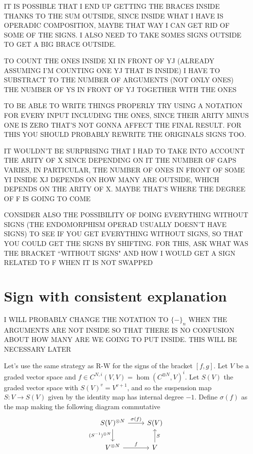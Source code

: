 \documentclass[twoside]{article}
\begin{document}
IT IS POSSIBLE THAT I END UP GETTING THE BRACES INSIDE THANKS TO THE SUM OUTSIDE, SINCE INSIDE WHAT I HAVE IS OPERADIC COMPOSITION, MAYBE THAT WAY I CAN GET RID OF SOME OF THE SIGNS. I ALSO NEED TO TAKE SOMES SIGNS OUTSIDE TO GET A BIG BRACE OUTSIDE.

TO COUNT THE ONES INSIDE XI IN FRONT OF YJ (ALREADY ASSUMING I'M COUNTING ONE YJ THAT IS INSIDE) I HAVE TO SUBSTRACT TO THE NUMBER OF ARGUMENTS (NOT ONLY ONES) THE NUMBER OF YS IN FRONT OF YJ TOGETHER WITH THE ONES

TO BE ABLE TO WRITE THINGS PROPERLY TRY USING A NOTATION FOR EVERY INPUT INCLUDING THE ONES, SINCE THEIR ARITY MINUS ONE IS ZERO THAT'S NOT GONNA AFFECT THE FINAL RESULT. FOR THIS YOU SHOULD PROBABLY REWRITE THE ORIGINALS SIGNS TOO.

IT WOULDN'T BE SURPRISING THAT I HAD TO TAKE INTO ACCOUNT THE ARITY OF X SINCE DEPENDING ON IT THE NUMBER OF GAPS VARIES, IN PARTICULAR, THE NUMBER OF ONES IN FRONT OF SOME YI INSIDE XJ DEPENDS ON HOW MANY ARE OUTSIDE, WHICH DEPENDS ON THE ARITY OF X. MAYBE THAT'S WHERE THE DEGREE OF F IS GOING TO COME

CONSIDER ALSO THE POSSIBILITY OF DOING EVERYTHING WITHOUT SIGNS (THE ENDOMORPHISM OPERAD USUALLY DOESN'T HAVE SIGNS) TO SEE IF YOU GET EVERYTHING WITHOUT SIGNS, SO THAT YOU COULD GET THE SIGNS BY SHIFTING. FOR THIS, ASK WHAT WAS THE BRACKET ``WITHOUT SIGNS" AND HOW I WOULD GET A SIGN RELATED TO F WHEN IT IS NOT SWAPPED

\section{Sign with consistent explanation}
I WILL PROBABLY CHANGE THE NOTATION TO $\{-\}_n$ WHEN THE ARGUMENTS ARE NOT INSIDE SO THAT THERE IS NO CONFUSION ABOUT HOW MANY ARE WE GOING TO PUT INSIDE. THIS WILL BE NECESSARY LATER

Let's use the same strategy as R-W for the signs of the bracket $[f,g]$. Let $V$ be a graded vector space and $f\in C^{N,i}(V,V)=\hom(C^{\otimes N},V)^i$. Let $S(V)$ the graded vector space with $S(V)^v=V^{v+1}$, and so the suspension map $S:V\to S(V)$ given by the identity map has internal degree $-1$. Define $\sigma(f)$ as the map making the following diagram commutative
\[
\begin{tikzcd}
S(V)^{\otimes N}\arrow[r, "\sigma(f)"]\arrow[d, "(S^{-1})^{\otimes N}"'] & S(V)\\
V^{\otimes N}\arrow[r,"f"] & V\arrow[u, "S"']
\end{tikzcd}
\]
\end{document}
